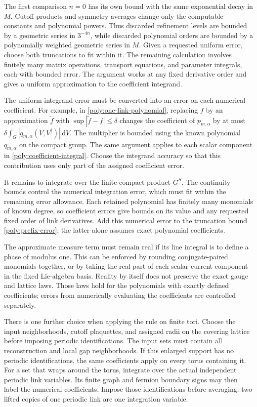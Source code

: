 \documentclass[11pt,a4paper]{article}
\theoremstyle{remark}
\newcommand{\dd}{\mathrm d}
\begin{document}
The first comparison $n=0$ has its own bound with the same exponential
decay in $M$. Cutoff products and symmetry averages change only the
computable constants and polynomial powers. Thus discarded refinement
levels are bounded by a geometric series in $3^{-4n}$, while discarded
polynomial orders are bounded by a polynomially weighted geometric
series in $M$. Given a requested uniform error, choose both truncations
to fit within it. The remaining calculation involves finitely many
matrix operations, transport equations, and parameter integrals, each
with bounded error. The argument works at any fixed derivative order
and gives a uniform approximation to the coefficient integrand.

The uniform integrand error must be converted into an error on each
numerical coefficient. For example, in
\eqref{poly:one-link-polynomial}, replacing $f$ by an approximation
$\widetilde f$ with $\sup|\widetilde f-f|\le\delta$ changes the
coefficient of $p_{m,\alpha}$ by at most
$\delta\int_G|q_{m,\alpha}(V,V^\dagger)|\,\dd V$.
The multiplier is bounded using the known polynomial
$q_{m,\alpha}$ on the compact group. The same argument applies to
each scalar component in \eqref{poly:coefficient-integral}.
Choose the integrand accuracy so that this contribution uses only part
of the assigned coefficient error.

It remains to integrate over the finite compact product $G^S$.
The continuity bounds control the numerical integration error, which
must fit within the remaining error allowance. Each retained polynomial has finitely many monomials of
known degree, so coefficient errors give bounds on its value and any
requested fixed order of link derivatives. Add this numerical error
to the truncation bound \eqref{poly:prefix-error}; the latter alone
assumes exact polynomial coefficients.

The approximate measure term must remain real if its line integral is
to define a phase of modulus one. This can be enforced by rounding
conjugate-paired monomials together, or by taking the real part of each
scalar current component in the fixed Lie-algebra basis. Reality by
itself does not preserve the exact gauge and lattice laws. Those laws
hold for the polynomials with exactly defined coefficients; errors from
numerically evaluating the coefficients are controlled separately.

There is one further choice when applying the rule on finite tori.
Choose the input neighborhoods, cutoff plaquettes, and assigned radii
on the covering lattice before imposing periodic identifications. The
input sets must contain all reconstruction and local gap neighborhoods.
If this enlarged support has no periodic identifications, the same
coefficients apply on every torus containing it. For a set that wraps
around the torus, integrate over the actual independent periodic link
variables. Its finite graph and fermion boundary signs may then label
the numerical coefficients. Impose those identifications before
averaging: two lifted copies of one periodic link are one integration
variable.
\end{document}
